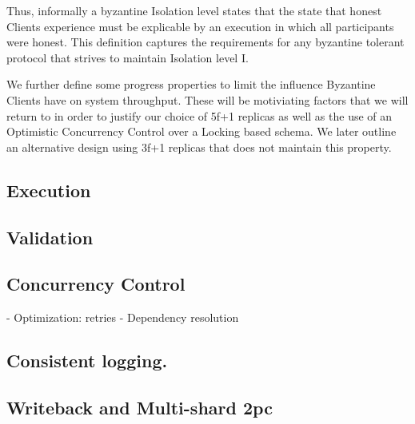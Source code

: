 Thus, informally a byzantine Isolation level states that the state that honest Clients experience must be explicable by an execution in which all participants were honest.
This definition captures the requirements for any byzantine tolerant protocol that strives to maintain Isolation level I.

We further define some progress properties to limit the influence Byzantine Clients have on system throughput. These will be motiviating factors that we will return to in order to justify our choice of 5f+1 replicas as well as the use of an Optimistic Concurrency Control over a Locking based schema. We later outline an alternative design using 3f+1 replicas that does not maintain this property. 




\subsection{Execution}
\subsection{Validation}

\subsection{Concurrency Control}
 - Optimization: retries
 - Dependency resolution
\subsection{Consistent logging.}



\subsection{Writeback and Multi-shard 2pc}

